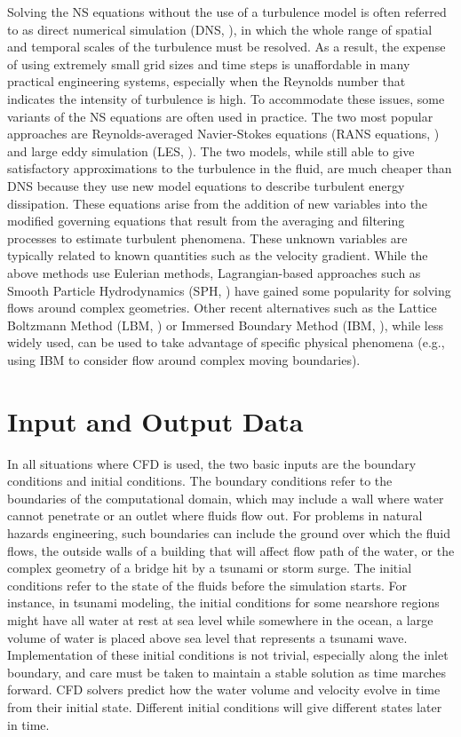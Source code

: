 Solving the NS equations without the use of a turbulence model is often referred to as direct numerical simulation (DNS,  \cite{Orszag1970DNS}), in which the whole range of spatial and temporal scales of the turbulence must be resolved. As a result, the expense of using extremely small grid sizes and time steps is unaffordable in many practical engineering systems, especially when the Reynolds number that indicates the intensity of turbulence is high. To accommodate these issues, some variants of the NS equations are often used in practice. The two most popular approaches are Reynolds-averaged Navier-Stokes equations (RANS equations, \cite{Reynolds1895RANS, Chou1945RANS}) and large eddy simulation (LES, \cite{Deardorff1970LES}). The two models, while still able to give satisfactory approximations to the turbulence in the fluid, are much cheaper than DNS because they use new model equations to describe turbulent energy dissipation. These equations arise from the addition of new variables into the modified governing equations that result from the averaging and filtering processes to estimate turbulent phenomena. These unknown variables are typically related to known quantities such as the velocity gradient.  
While the above methods use Eulerian methods, Lagrangian-based approaches such as Smooth Particle Hydrodynamics (SPH,  \cite{Gingold1977SPH, Lucy1977SPH, Lind2020SPH}) have gained some popularity  for solving flows around complex geometries.  Other recent alternatives such as the Lattice Boltzmann Method (LBM,  \cite{Chen1998LBM}) or Immersed Boundary Method (IBM,  \cite{Peskin1972IBM, Peskin1977IBM, Peskin2002IBM}), while less widely used, can be used to take advantage of specific physical phenomena (e.g., using IBM to consider flow around complex moving boundaries).  
 
\section{Input and Output Data}
\label{sec:resp_cfd_water_io}

In all situations where CFD is used, the two basic inputs are the boundary conditions and initial conditions. The boundary conditions refer to the boundaries of the computational domain, which may include a wall where water cannot penetrate or an outlet where fluids flow out. For problems in natural hazards engineering, such boundaries can include the ground over which the fluid flows, the outside walls of a building that will affect flow path of the water, or the complex geometry of a bridge hit by a tsunami or storm surge. The initial conditions refer to the state of the fluids before the simulation starts. For instance, in tsunami modeling, the initial conditions for some nearshore regions might have all water at rest at sea level while somewhere in the ocean, a large volume of water is placed above sea level that represents a tsunami wave. Implementation of these initial conditions is not trivial, especially along the inlet boundary, and care must be taken to maintain a stable solution as time marches forward.  CFD solvers predict how the water volume and velocity evolve in time from their initial state. Different initial conditions will give different states later in time.


